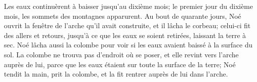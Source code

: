 Les eaux continuèrent à baisser jusqu’au dixième mois;
	le premier jour du dixième mois, les sommets des montagnes apparurent.
Au bout de quarante jours,
	Noé ouvrit la fenêtre de l’arche qu’il avait construite,
	et il lâcha le corbeau; celui-ci fit des allers et retours,
	jusqu’à ce que les eaux se soient retirées, laissant la terre à sec.
Noé lâcha aussi la colombe pour voir si les eaux avaient baissé à la surface du sol.
La colombe ne trouva pas d’endroit où se poser,
	et elle revint vers l’arche auprès de lui,
	parce que les eaux étaient sur toute la surface de la terre;
	Noé tendit la main, prit la colombe, et la fit rentrer auprès de lui dans l’arche.
